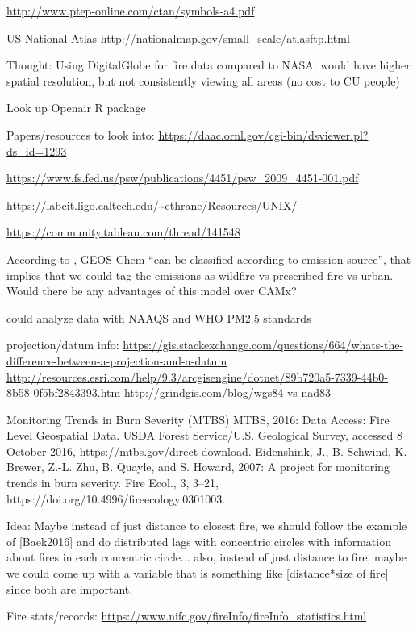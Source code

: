 \url{http://www.ptep-online.com/ctan/symbols-a4.pdf}

US National Atlas \url{http://nationalmap.gov/small_scale/atlasftp.html}

Thought: Using DigitalGlobe for fire data compared to NASA: would have higher spatial resolution, but not consistently viewing all areas (no cost to CU people) 

Look up Openair R package

Papers/resources to look into: \url{https://daac.ornl.gov/cgi-bin/dsviewer.pl?ds_id=1293}

\url{https://www.fs.fed.us/psw/publications/4451/psw_2009_4451-001.pdf}

\url{https://labcit.ligo.caltech.edu/~ethrane/Resources/UNIX/}

\url{https://community.tableau.com/thread/141548}

According to \cite{liu_particulate_2016}, GEOS-Chem ``can be classified according to emission source'', that implies that we could tag the emissions as wildfire vs prescribed fire vs urban. Would there be any advantages of this model over CAMx?

could analyze data with NAAQS and WHO PM2.5 standards

projection/datum info: \url{https://gis.stackexchange.com/questions/664/whats-the-difference-between-a-projection-and-a-datum}
\url{http://resources.esri.com/help/9.3/arcgisengine/dotnet/89b720a5-7339-44b0-8b58-0f5bf2843393.htm}
\url{http://grindgis.com/blog/wgs84-vs-nad83}

Monitoring Trends in Burn Severity (MTBS) MTBS, 2016: Data Access: Fire Level Geospatial Data. USDA Forest Service/U.S. Geological Survey, accessed 8 October 2016, https://mtbs.gov/direct-download. 
Eidenshink, J., B. Schwind, K. Brewer, Z.-L. Zhu, B. Quayle, and S. Howard, 2007: A project for monitoring trends in burn severity. Fire Ecol., 3, 3–21, https://doi.org/10.4996/fireecology.0301003. 

Idea: Maybe instead of just distance to closest fire, we should follow the example of [Baek2016] and do distributed lags with concentric circles with information about fires in each concentric circle... also, instead of just distance to fire, maybe we could come up with a variable that is something like [distance*size of fire] since both are important.

Fire stats/records: \url{https://www.nifc.gov/fireInfo/fireInfo_statistics.html}

